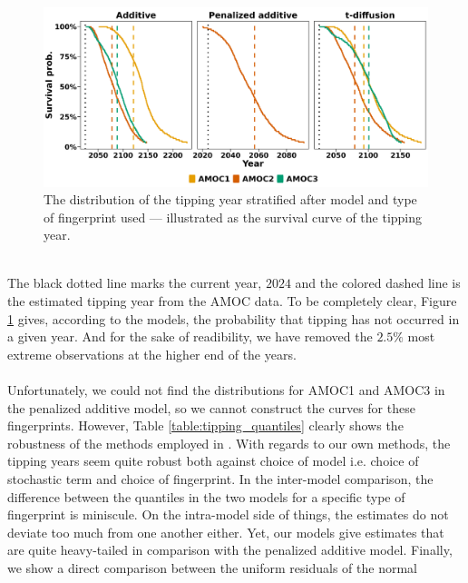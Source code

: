 \begin{figure}[h!]
    \begin{center}
        \includegraphics[scale = .096]{figures/surival_curve_first97.5.jpeg}
        \caption{The distribution of the tipping year stratified after model and type of fingerprint used — illustrated as the survival curve of the tipping year.}
        \label{figure:surival_curve_taus}
    \end{center}
\end{figure}\\
The black dotted line marks the current year, $2024$ and the colored dashed line is the estimated tipping year from the AMOC data. To be completely clear, Figure \ref{figure:surival_curve_taus} gives, according to the models, the probability that tipping has not occurred in a given year. And for the sake of readibility, we have removed the $2.5\%$ most extreme observations at the higher end of the years.\\\\
Unfortunately, we could not find the distributions for AMOC1 and AMOC3 in the penalized additive model, so we cannot construct the curves for these fingerprints. However, Table \ref{table:tipping_quantiles} clearly shows the robustness of the methods employed in \cite{Ditlevsen2023}. With regards to our own methods, the tipping years seem quite robust both against choice of model i.e. choice of stochastic term and choice of fingerprint. In the inter-model comparison, the difference between the quantiles in the two models for a specific type of fingerprint is miniscule. On the intra-model side of things, the estimates do not deviate too much from one another either. Yet, our models give estimates that are quite heavy-tailed in comparison with the penalized additive model.
\newpage
\noindent Finally, we show a direct comparison between the uniform residuals of the normal
